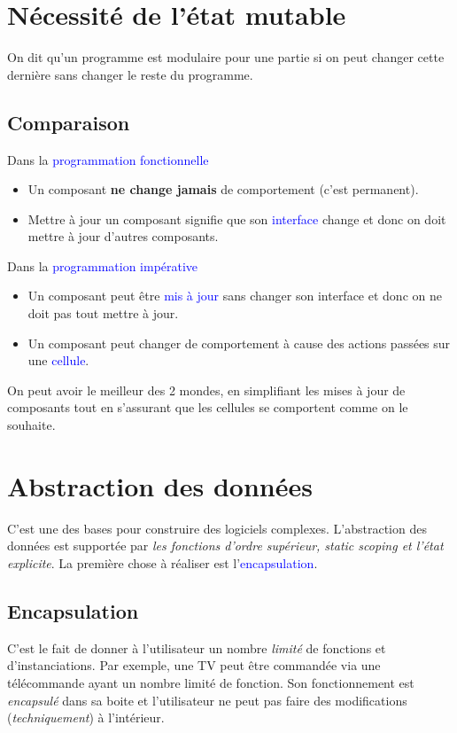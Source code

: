 \documentclass{report}
\begin{document}
\section{Nécessité de l'état mutable}
On dit qu'un programme est modulaire pour une partie si on peut changer cette dernière sans changer le reste du programme.

\subsection{Comparaison}
\noindent
Dans la \textcolor{blue}{programmation fonctionnelle}
\begin{itemize}
\item Un composant \textbf{ne change jamais} de comportement (c'est permanent).
\item Mettre à jour un composant signifie que son \textcolor{blue}{interface} change et donc on doit mettre à jour d'autres composants.
\end{itemize}
Dans la \textcolor{blue}{programmation impérative}
\begin{itemize}
\item Un composant peut être \textcolor{blue}{mis à jour} sans changer son interface et donc on ne doit pas tout mettre à jour.
\item Un composant peut changer de comportement à cause des actions passées sur une \textcolor{blue}{cellule}.
\end{itemize}
On peut avoir le meilleur des 2 mondes, en simplifiant les mises à jour de composants tout en s'assurant que les cellules se comportent comme on le souhaite.

\section{Abstraction des données}
C'est une des bases pour construire des logiciels complexes. L'abstraction des données est supportée par \textit{les fonctions d'ordre supérieur, static scoping et l'état explicite}. La première chose à réaliser est l'\textcolor{blue}{encapsulation}.

\subsection{Encapsulation}
C'est le fait de donner à l'utilisateur un nombre \textit{limité} de fonctions et d'instanciations. Par exemple, une TV peut être commandée via une télécommande ayant un nombre limité de fonction. Son fonctionnement est \textit{encapsulé} dans sa boite et l'utilisateur ne peut pas faire des modifications (\textit{techniquement}) à l'intérieur.
\end{document}
